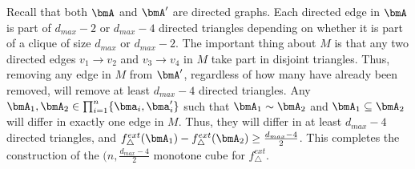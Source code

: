 Recall that both
$\bmA$ and $\bmA'$ are directed graphs. Each directed edge in $\bmA$ is part of
$d_{max}-2$ or $d_{max}-4$ directed triangles depending on whether it is part of
a clique of size $d_{max}$ or $d_{max}-2$. The important thing about $M$ is that
any two directed edges $v_1 \rightarrow v_2$ and $v_3 \rightarrow v_4$ in
$M$ take part in disjoint triangles. Thus, removing any edge in $M$ from
$\bmA'$, regardless of how many have already been removed, will remove at least
$d_{max}-4$ directed triangles. Any $\bmA_1, \bmA_2 \in
\prod_{i=1}^n \{\bma_i, \bma_i'\}$ such that $\bmA_1 \sim \bmA_2$ and $\bmA_1
\subseteq \bmA_2$ will differ in exactly one edge in $M$. Thus, they will differ
in at least $d_{max}-4$ directed triangles, and $f_\triangle^{ext}(\bmA_1) -
f_\triangle^{ext}(\bmA_2) \geq \frac{d_{max}-4}{2}$. This completes the
construction of the $(n, \frac{d_{max}-4}{2}$ monotone cube for
$f_\triangle^{ext}$.


